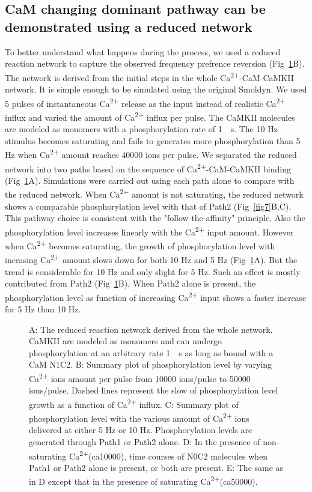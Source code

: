 \documentclass[10pt,letterpaper]{article}
\begin{document}
\subsection*{CaM changing dominant pathway can be demonstrated using a reduced network }

To better understand what happens during the process, we used a reduced reaction network to capture the observed frequency prefrence reversion (Fig~\ref{fig8}B). The network is derived from the initial steps in the whole Ca\textsuperscript{2+}-CaM-CaMKII network. It is simple enough to be simulated using the original Smoldyn. We used 5 pulses of instantaneous Ca\textsuperscript{2+} release as the input instead of realistic Ca\textsuperscript{2+} influx and varied the amount of Ca\textsuperscript{2+} influx per pulse. The CaMKII molecules are modeled as monomers with a phosphorylation rate of \SI{1}{\per\s}. The 10 Hz stimulus becomes saturating and fails to generates more phosphorylation than 5 Hz when Ca\textsuperscript{2+} amount reaches 40000 ions per pulse. We separated the reduced network into two paths based on the sequence of Ca\textsuperscript{2+}-CaM-CaMKII binding (Fig~\ref{fig8}A). Simulations were carried out using each path alone to compare with the reduced network. When Ca\textsuperscript{2+} amount is not saturating, the reduced network shows a comparable phosphorylation level with that of Path2 (Fig~\ref{fig7}B,C). This pathway choice is consistent with the "follow-the-affinity" principle. Also the phosphorylation level increases linearly with the Ca\textsuperscript{2+} input amount. However when Ca\textsuperscript{2+} becomes saturating, the growth of phosphorylation level with incrasing Ca\textsuperscript{2+} amount slows down for both 10 Hz and 5 Hz (Fig~\ref{fig8}A). But the trend is considerable for 10 Hz and only slight for 5 Hz. Such an effect is mostly contributed from Path2 (Fig~\ref{fig8}B). When Path2 alone is present, the phosphorylation level as function of increasing Ca\textsuperscript{2+} input shows a faster increase for 5 Hz than 10 Hz.

\begin{figure}[!h]
	\caption{{\bf}
	A: The reduced reaction network derived from the whole network. CaMKII are modeled as monomers and can undergo phosphorylation at an arbitrary rate \SI{1}{\per\s} as long as bound with a CaM N1C2. B: Summary plot of phosphorylation level by varying Ca\textsuperscript{2+} ions amount per pulse from 10000 ions/pulse to 50000 ions/pulse. Dashed lines represent the slow of phosphorylation level growth as a function of Ca\textsuperscript{2+} influx. C: Summary plot of phosphorylation level with the various amount of Ca\textsuperscript{2+} ions delivered at either 5 Hz or 10 Hz. Phosphorylation levels are generated through Path1 or Path2 alone. D: In the presence of non-saturating Ca\textsuperscript{2+}(ca10000), time courses of N0C2 molecules when Path1 or Path2 alone is present, or both are present. E: The same as in D except that in the presence of saturating Ca\textsuperscript{2+}(ca50000).}
\label{fig8}
\end{figure}
\end{document}
